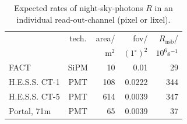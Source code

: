 \documentclass{article}%
\begin{document}
\begin{multicols}{2}
\begin{table}[H]
\begin{center}
    \begin{tabular}{lcrrr}
        &tech.& area/ & fov/&$R_\text{nsb}$/\\
        &     & m$^2$ & $(1^\circ)^{2}$&$10^6$s$^{-1}$\\
      \hline
      FACT &SiPM& 10 & 0.01 & 29\\
      H.E.S.S. CT-1 &PMT& 108 & 0.0222 & 344\\
      H.E.S.S. CT-5 &PMT& 614 & 0.0039 & 347\\
      Portal, 71m &PMT& 65 & 0.0039 & 37\\
    \end{tabular}
    \caption{Expected rates of night-sky-photons $R$ in an individual read-out-channel (pixel or lixel).}
    \label{TabInstrumentsNsbRates}
  \end{center}
\end{table}
%

\end{multicols}
\end{document}

